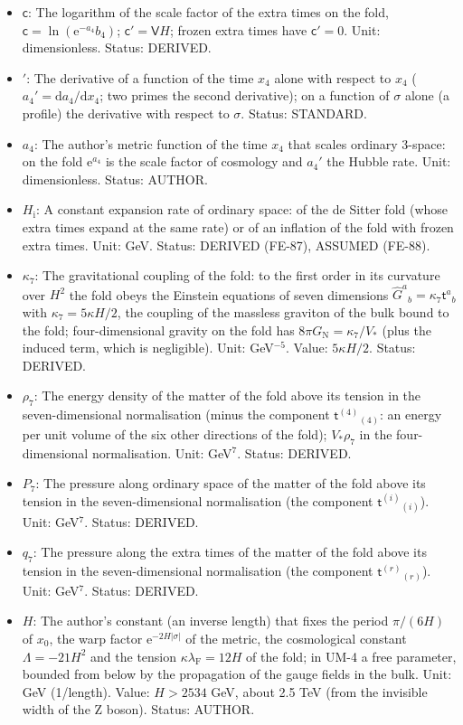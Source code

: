 \documentclass[
  10pt,
]{article}
\providecommand{\tightlist}{%
  \setlength{\itemsep}{0pt}\setlength{\parskip}{0pt}}
\begin{document}
\begin{itemize}
\tightlist
\item
  \(\mathsf{c}\): The logarithm of the scale factor of the extra times
  on the fold, \(\mathsf{c} = \ln(\mathrm{e}^{-a_4}b_4)\);
  \(\mathsf{c}' = \mathsf{V}H\); frozen extra times have
  \(\mathsf{c}' = 0\). Unit: dimensionless. Status: DERIVED.
\item
  \({}'\): The derivative of a function of the time \(x_4\) alone with
  respect to \(x_4\) (\(a_4' = \mathrm{d}a_4/\mathrm{d}x_4\); two primes
  the second derivative); on a function of \(\sigma\) alone (a profile)
  the derivative with respect to \(\sigma\). Status: STANDARD.
\item
  \(a_4\): The author's metric function of the time \(x_4\) that scales
  ordinary 3-space: on the fold \(\mathrm{e}^{a_4}\) is the scale factor
  of cosmology and \(a_4'\) the Hubble rate. Unit: dimensionless.
  Status: AUTHOR.
\item
  \(H_{\mathrm{i}}\): A constant expansion rate of ordinary space: of
  the de Sitter fold (whose extra times expand at the same rate) or of
  an inflation of the fold with frozen extra times. Unit: GeV. Status:
  DERIVED (FE-87), ASSUMED (FE-88).
\item
  \(\kappa_7\): The gravitational coupling of the fold: to the first
  order in its curvature over \(H^2\) the fold obeys the Einstein
  equations of seven dimensions
  \(\hat G^a{}_b = \kappa_7\mathsf{t}^a{}_b\) with
  \(\kappa_7 = 5\kappa H/2\), the coupling of the massless graviton of
  the bulk bound to the fold; four-dimensional gravity on the fold has
  \(8\pi G_{\mathrm{N}} = \kappa_7/V_*\) (plus the induced term, which
  is negligible). Unit: GeV\(^{-5}\). Value: \(5\kappa H/2\). Status:
  DERIVED.
\item
  \(\rho_7\): The energy density of the matter of the fold above its
  tension in the seven-dimensional normalisation (minus the component
  \(\mathsf{t}^{(4)}{}_{(4)}\): an energy per unit volume of the six
  other directions of the fold); \(V_*\rho_7\) in the four-dimensional
  normalisation. Unit: GeV\(^7\). Status: DERIVED.
\item
  \(P_7\): The pressure along ordinary space of the matter of the fold
  above its tension in the seven-dimensional normalisation (the
  component \(\mathsf{t}^{(i)}{}_{(i)}\)). Unit: GeV\(^7\). Status:
  DERIVED.
\item
  \(q_7\): The pressure along the extra times of the matter of the fold
  above its tension in the seven-dimensional normalisation (the
  component \(\mathsf{t}^{(r)}{}_{(r)}\)). Unit: GeV\(^7\). Status:
  DERIVED.
\item
  \(H\): The author's constant (an inverse length) that fixes the period
  \(\pi/(6H)\) of \(x_0\), the warp factor
  \(\mathrm{e}^{-2H\lvert\sigma\rvert}\) of the metric, the cosmological
  constant \(\Lambda = -21H^2\) and the tension
  \(\kappa\lambda_{\mathrm{F}} = 12H\) of the fold; in UM-4 a free
  parameter, bounded from below by the propagation of the gauge fields
  in the bulk. Unit: GeV (1/length). Value: \(H > 2534\) GeV, about 2.5
  TeV (from the invisible width of the Z boson). Status: AUTHOR.
\end{itemize}
\end{document}
